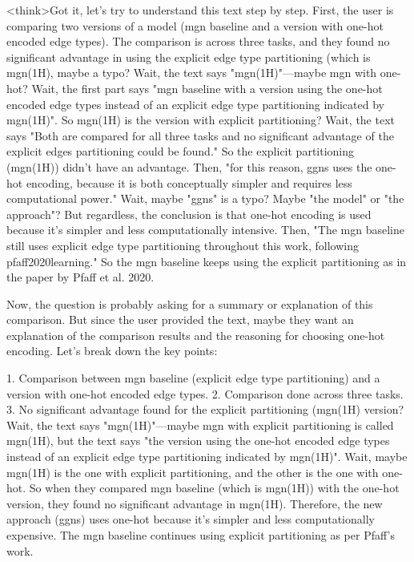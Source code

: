 <think>Got it, let's try to understand this text step by step. First, the user is comparing two versions of a model (mgn baseline and a version with one-hot encoded edge types). The comparison is across three tasks, and they found no significant advantage in using the explicit edge type partitioning (which is mgn(1H), maybe a typo? Wait, the text says "mgn(1H)"—maybe mgn with one-hot? Wait, the first part says "mgn baseline with a version using the one-hot encoded edge types instead of an explicit edge type partitioning indicated by mgn(1H)". So mgn(1H) is the version with explicit partitioning? Wait, the text says "Both are compared for all three tasks and no significant advantage of the explicit edges partitioning could be found." So the explicit partitioning (mgn(1H)) didn't have an advantage. Then, "for this reason, ggns uses the one-hot encoding, because it is both conceptually simpler and requires less computational power." Wait, maybe "ggns" is a typo? Maybe "the model" or "the approach"? But regardless, the conclusion is that one-hot encoding is used because it's simpler and less computationally intensive. Then, "The mgn baseline still uses explicit edge type partitioning throughout this work, following pfaff2020learning." So the mgn baseline keeps using the explicit partitioning as in the paper by Pfaff et al. 2020.

Now, the question is probably asking for a summary or explanation of this comparison. But since the user provided the text, maybe they want an explanation of the comparison results and the reasoning for choosing one-hot encoding. Let's break down the key points:

1. Comparison between mgn baseline (explicit edge type partitioning) and a version with one-hot encoded edge types.
2. Comparison done across three tasks.
3. No significant advantage found for the explicit partitioning (mgn(1H) version? Wait, the text says "mgn(1H)"—maybe mgn with explicit partitioning is called mgn(1H), but the text says "the version using the one-hot encoded edge types instead of an explicit edge type partitioning indicated by mgn(1H)". Wait, maybe mgn(1H) is the one with explicit partitioning, and the other is the one with one-hot. So when they compared mgn baseline (which is mgn(1H)) with the one-hot version, they found no significant advantage in mgn(1H). Therefore, the new approach (ggns) uses one-hot because it's simpler and less computationally expensive. The mgn baseline continues using explicit partitioning as per Pfaff's work.

